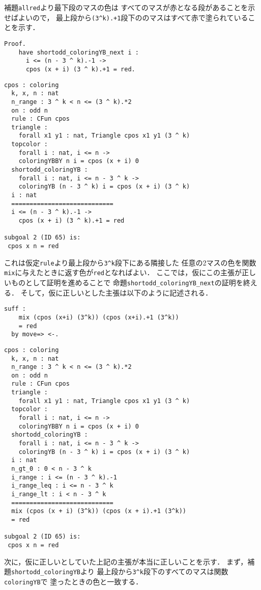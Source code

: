 補題{\tt{allred}}より最下段のマスの色は
すべてのマスが赤となる段があることを示せばよいので，
最上段から{\tt{(3\verb|^|k).+1}}段下ののマスはすべて赤で塗られていることを示す．
\begin{lstlisting}[language=Coq]
  Proof.
    have shortodd_coloringYB_next i :
      i <= (n - 3 ^ k).-1 ->
      cpos (x + i) (3 ^ k).+1 = red.
\end{lstlisting}
\begin{lstlisting}[language=Coq]
  cpos : coloring
  k, x, n : nat
  n_range : 3 ^ k < n <= (3 ^ k).*2
  on : odd n
  rule : CFun cpos
  triangle :
    forall x1 y1 : nat, Triangle cpos x1 y1 (3 ^ k)
  topcolor :
    forall i : nat, i <= n ->
    coloringYBBY n i = cpos (x + i) 0
  shortodd_coloringYB :
    forall i : nat, i <= n - 3 ^ k ->
    coloringYB (n - 3 ^ k) i = cpos (x + i) (3 ^ k)
  i : nat
  ============================
  i <= (n - 3 ^ k).-1 ->
    cpos (x + i) (3 ^ k).+1 = red

subgoal 2 (ID 65) is:
 cpos x n = red
\end{lstlisting}
これは仮定{\tt{rule}}より最上段から{\tt{3\verb|^|k}}段下にある隣接した
任意の2マスの色を関数{\tt{mix}}に与えたときに返す色が{\tt{red}}となればよい．
ここでは，仮にこの主張が正しいものとして証明を進めることで
命題{\tt{shortodd\_coloringYB\_next}}の証明を終える．
そして，仮に正しいとした主張は以下のように記述される．
\begin{lstlisting}[language=Coq]
  suff :
    mix (cpos (x+i) (3^k)) (cpos (x+i).+1 (3^k))
    = red
  by move=> <-.
\end{lstlisting}
\begin{lstlisting}[language=Coq]
  cpos : coloring
  k, x, n : nat
  n_range : 3 ^ k < n <= (3 ^ k).*2
  on : odd n
  rule : CFun cpos
  triangle :
    forall x1 y1 : nat, Triangle cpos x1 y1 (3 ^ k)
  topcolor :
    forall i : nat, i <= n ->
    coloringYBBY n i = cpos (x + i) 0
  shortodd_coloringYB :
    forall i : nat, i <= n - 3 ^ k ->
    coloringYB (n - 3 ^ k) i = cpos (x + i) (3 ^ k)
  i : nat
  n_gt_0 : 0 < n - 3 ^ k
  i_range : i <= (n - 3 ^ k).-1
  i_range_leq : i <= n - 3 ^ k
  i_range_lt : i < n - 3 ^ k
  ============================
  mix (cpos (x + i) (3^k)) (cpos (x + i).+1 (3^k))
  = red
  
subgoal 2 (ID 65) is:
 cpos x n = red
\end{lstlisting}
次に，仮に正しいとしていた上記の主張が本当に正しいことを示す．
まず，補題{\tt{shortodd\_coloringYB}}より
最上段から{\tt{3\verb|^|k}}段下のすべてのマスは関数{\tt{coloringYB}}で
塗ったときの色と一致する．
